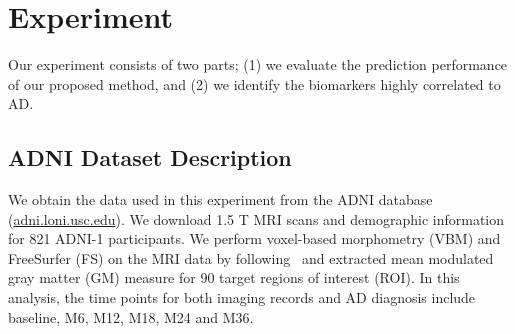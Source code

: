 \iffalse
We experimentally demonstrated the added value of these novel characteristics in predicting the MCI-to-AD conversion on data obtained from the Alzheimer’s Disease Neuroimaging Initiative (ADNI) database. 
The results presented in this study demonstrate the potential of the suggested approach for early AD diagnosis and an important role of MRI in the MCI-to-AD conversion prediction. However, it is evident based on our results that combining MRI data with cognitive test results improved the accuracy of the MCI-to-AD conversion prediction. : %
The data used in this work is obtained from the Alzheimer’s Disease Neuroimaging Initiative (ADNI) database (www.loni.usc.edu/ADNI) and it includes MRI scans and neuropsychological test results from normal controls (NC), AD, and MCI subjects with a matched age range.
Data used in this work is obtained from the Alzheimer’s Disease Neuroimaging Initiative (ADNI) database (http://adni.loni.usc.edu/). 
Data used in this work include all subjects for whom baseline MRI data (T1-weighted MP-RAGE sequence at 1.5 T, typically 256 × 256 × 170 voxels with the voxel size of approximately 1 mm × 1 mm × 1.2 mm), at least moderately confident diagnoses (i.e. confidence > 2), hippocampus volumes (i.e. volumes of left and right hippocampi, calculated by FreeSurfer Version 4.3), and test scores in certain cognitive scales (i.e. ADAS: Alzheimer’s Disease Assessment Scale, range 0–85; CDR-SB: Clinical Dementia Rating ‘sum of boxes’, range 0–18; MMSE: Mini-Mental State Examination, range 0–30) were available.
We should note that, for fair comparison, we used the same training and test data across the experiments for all the competing methods.
\fi

\section{Experiment}
Our experiment consists of two parts; (1) we evaluate the prediction performance of our proposed method, and (2) we identify the biomarkers highly correlated to AD.
\subsection{ADNI Dataset Description}
We obtain the data used in this experiment from the ADNI database (\url{adni.loni.usc.edu}). We download 1.5 T MRI scans and demographic information for 821 ADNI-1 participants. We perform voxel-based morphometry (VBM) and FreeSurfer (FS) on the MRI data by following~\cite{risacher2010longitudinal} and extracted mean modulated gray matter (GM) measure for 90 target regions of interest (ROI). In this analysis, the time points for both imaging records and AD diagnosis include baseline, M6, M12, M18, M24 and M36. 
